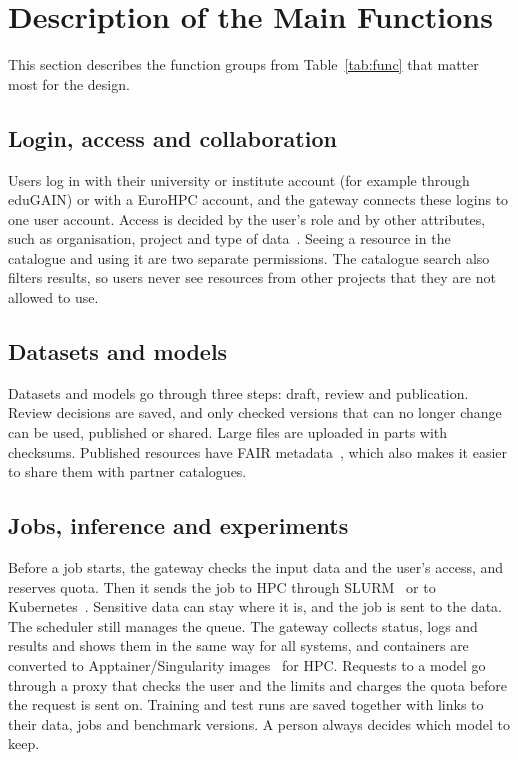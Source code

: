 \documentclass[conference,a4paper]{IEEEtran}
\begin{document}
\section{Description of the Main Functions}

This section describes the function groups from Table~\ref{tab:func} that matter most for the design.

\subsection{Login, access and collaboration}
Users log in with their university or institute account (for example through eduGAIN) or with a EuroHPC account, and the gateway connects these logins to one user account. Access is decided by the user's role and by other attributes, such as organisation, project and type of data~\cite{nist_abac}. Seeing a resource in the catalogue and using it are two separate permissions. The catalogue search also filters results, so users never see resources from other projects that they are not allowed to use.

\subsection{Datasets and models}
Datasets and models go through three steps: draft, review and publication. Review decisions are saved, and only checked versions that can no longer change can be used, published or shared. Large files are uploaded in parts with checksums. Published resources have FAIR metadata~\cite{wilkinson2016fair}, which also makes it easier to share them with partner catalogues.

\subsection{Jobs, inference and experiments}
Before a job starts, the gateway checks the input data and the user's access, and reserves quota. Then it sends the job to HPC through SLURM~\cite{yoo2003slurm} or to Kubernetes~\cite{burns2016borg}. Sensitive data can stay where it is, and the job is sent to the data. The scheduler still manages the queue. The gateway collects status, logs and results and shows them in the same way for all systems, and containers are converted to Apptainer/Singularity images~\cite{kurtzer2017singularity} for HPC. Requests to a model go through a proxy that checks the user and the limits and charges the quota before the request is sent on. Training and test runs are saved together with links to their data, jobs and benchmark versions. A person always decides which model to keep.
\end{document}
